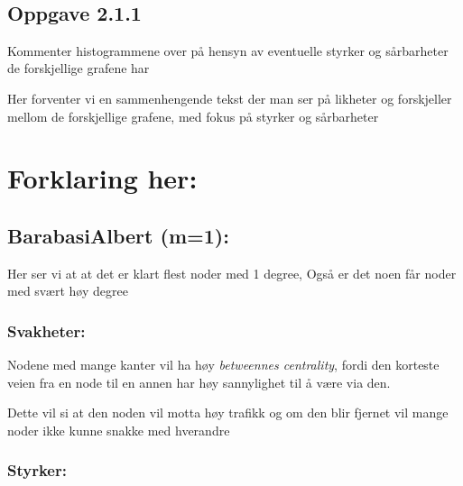 \documentclass[11pt]{article}
\begin{document}
    \begin{center}
    \end{center}
    { \hspace*{\fill} \\}
    
    \hypertarget{oppgave-2.1.1}{%
\subsection*{Oppgave 2.1.1}\label{oppgave-2.1.1}}

Kommenter histogrammene over på hensyn av eventuelle styrker og
sårbarheter de forskjellige grafene har

Her forventer vi en sammenhengende tekst der man ser på likheter og
forskjeller mellom de forskjellige grafene, med fokus på styrker og
sårbarheter

    \hypertarget{forklaring-her}{%
\section*{Forklaring her:}\label{forklaring-her}}

\hypertarget{barabasialbert-m1}{%
\subsection*{BarabasiAlbert (m=1):}\label{barabasialbert-m1}}

Her ser vi at at det er klart flest noder med 1 degree, Også er det noen
får noder med svært høy degree

\hypertarget{svakheter}{%
\subsubsection*{Svakheter:}\label{svakheter}}

Nodene med mange kanter vil ha høy \emph{betweennes centrality}, fordi
den korteste veien fra en node til en annen har høy sannylighet til å
være via den.

Dette vil si at den noden vil motta høy trafikk og om den blir fjernet
vil mange noder ikke kunne snakke med hverandre

\hypertarget{styrker}{%
\subsubsection*{Styrker:}\label{styrker}}
\end{document}
